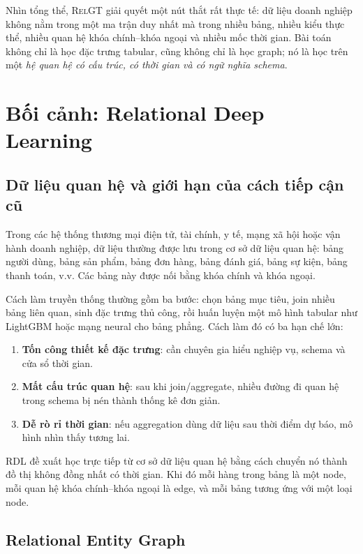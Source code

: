 \documentclass[12pt,a4paper]{article}
\newcommand{\RelGT}{\textsc{RelGT}}
\newcommand{\RDL}{\textsc{RDL}}
\begin{document}
Nhìn tổng thể, \RelGT{} giải quyết một nút thắt rất thực tế: dữ liệu doanh
nghiệp không nằm trong một ma trận duy nhất mà trong nhiều bảng, nhiều kiểu
thực thể, nhiều quan hệ khóa chính--khóa ngoại và nhiều mốc thời gian. Bài
toán không chỉ là học đặc trưng tabular, cũng không chỉ là học graph; nó là
học trên một \emph{hệ quan hệ có cấu trúc, có thời gian và có ngữ nghĩa schema}.

\section{Bối cảnh: Relational Deep Learning}

\subsection{Dữ liệu quan hệ và giới hạn của cách tiếp cận cũ}

Trong các hệ thống thương mại điện tử, tài chính, y tế, mạng xã hội hoặc
vận hành doanh nghiệp, dữ liệu thường được lưu trong cơ sở dữ liệu quan hệ:
bảng người dùng, bảng sản phẩm, bảng đơn hàng, bảng đánh giá, bảng sự kiện,
bảng thanh toán, v.v. Các bảng này được nối bằng khóa chính và khóa ngoại.

Cách làm truyền thống thường gồm ba bước: chọn bảng mục tiêu, join nhiều bảng
liên quan, sinh đặc trưng thủ công, rồi huấn luyện một mô hình tabular như
LightGBM hoặc mạng neural cho bảng phẳng. Cách làm đó có ba hạn chế lớn:
\begin{enumerate}
  \item \textbf{Tốn công thiết kế đặc trưng}: cần chuyên gia hiểu nghiệp vụ,
        schema và cửa sổ thời gian.
  \item \textbf{Mất cấu trúc quan hệ}: sau khi join/aggregate, nhiều đường đi
        quan hệ trong schema bị nén thành thống kê đơn giản.
  \item \textbf{Dễ rò rỉ thời gian}: nếu aggregation dùng dữ liệu sau thời điểm
        dự báo, mô hình nhìn thấy tương lai.
\end{enumerate}

\RDL{} đề xuất học trực tiếp từ cơ sở dữ liệu quan hệ bằng cách chuyển nó
thành đồ thị không đồng nhất có thời gian. Khi đó mỗi hàng trong bảng là một
node, mỗi quan hệ khóa chính--khóa ngoại là edge, và mỗi bảng tương ứng với
một loại node.

\subsection{Relational Entity Graph}
\end{document}
